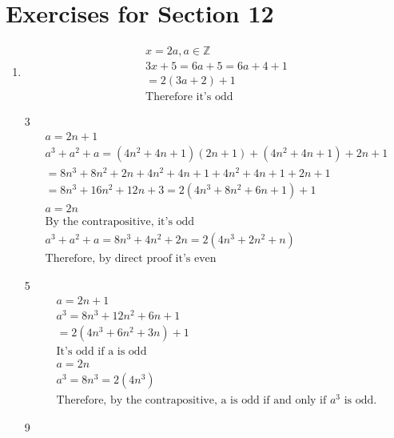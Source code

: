 \documentclass[12pt]{article}
\begin{document}
\section*{Exercises for Section 12}
\begin{enumerate}
	\item 
	    \begin{equation*}
	    	\begin{split}
		    x = 2a, a \in \mathbb{Z}\\
		    3x + 5 = 6a + 5 = 6a + 4 + 1\\
		    = 2(3a + 2) + 1\\
		    \text{Therefore it's odd}
	    	\end{split}
	    \end{equation*}
	\item [3]
	    \begin{equation*}
	    	\begin{split}
	    	    a = 2n + 1\\
		    a^3 + a^2 + a = (4n^2 + 4n + 1)(2n + 1) + (4n^2 + 4n + 1) + 2n + 1\\
		    = 8n^3 + 8n^2 + 2n + 4n^2 + 4n + 1 + 4n^2 + 4n + 1 + 2n + 1\\
		    = 8n^3 + 16n^2 + 12n + 3 = 2(4n^3 + 8n^2 + 6n + 1) + 1\\
		    a = 2n\\
		    \text{By the contrapositive, it's odd}\\
		    a^3 + a^2 + a = 8n^3 + 4n^2 + 2n = 2(4n^3 + 2n^2 + n)\\
		    \text{Therefore, by direct proof it's even}
	    	\end{split}
	    \end{equation*}
	\item [5] 
	    \begin{equation*}
	    	\begin{split}
	    	    a = 2n + 1\\
		    a^3 = 8n^3 + 12n^2 + 6n + 1\\
		    = 2(4n^3 + 6n^2 + 3n)+1\\
		    \text{It's odd if a is odd}\\
		    a = 2n\\
		    a^3 = 8n^3 = 2(4n^3)\\
		    \text{Therefore, by the contrapositive, a is odd if and only if $a^3$ is odd.}
	    	\end{split}
	    \end{equation*}
	\item [9] 

\end{enumerate}
\end{document}
